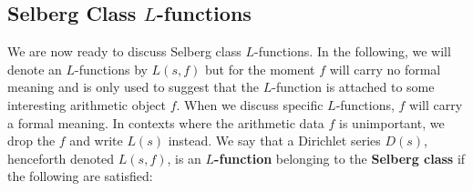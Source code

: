 \documentclass[12pt]{book}
\theoremstyle{definition}\newframedtheorem{method}{Method}
\newcommand{\<}{\langle}
\renewcommand{\>}{\rangle}
\begin{document}
    \subsection*{Selberg Class \texorpdfstring{$L$}{L}-functions}
      We are now ready to discuss Selberg class $L$-functions. In the following, we will denote an $L$-functions by $L(s,f)$ but for the moment $f$ will carry no formal meaning and is only used to suggest that the $L$-function is attached to some interesting arithmetic object $f$. When we discuss specific $L$-functions, $f$ will carry a formal meaning. In contexts where the arithmetic data $f$ is unimportant, we drop the $f$ and write $L(s)$ instead. We say that a Dirichlet series $D(s)$, henceforth denoted $L(s,f)$, is an \textbf{$L$-function} belonging to the \textbf{Selberg class} if the following are satisfied:
\end{document}
